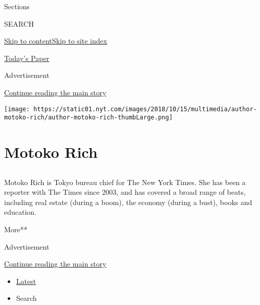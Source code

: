 Sections

SEARCH

\protect\hyperlink{site-content}{Skip to
content}\protect\hyperlink{site-index}{Skip to site index}

\href{https://myaccount.nytimes.com/auth/login?response_type=cookie\&client_id=vi}{}

\href{https://www.nytimes.com/section/todayspaper}{Today's Paper}

Advertisement

\protect\hyperlink{after-top}{Continue reading the main story}

\texttt{[image: https://static01.nyt.com/images/2018/10/15/multimedia/author-motoko-rich/author-motoko-rich-thumbLarge.png]}

\hypertarget{motoko-rich}{%
\section{Motoko Rich}\label{motoko-rich}}

\subsection{}

Motoko Rich is Tokyo bureau chief for The New York Times. She has been a
reporter with The Times since 2003, and has covered a broad range of
beats, including real estate (during a boom), the economy (during a
bust), books and education.

More**

Advertisement

\protect\hyperlink{after-mid1}{Continue reading the main story}

\begin{itemize}
\tightlist
\item
  \protect\hyperlink{stream-panel}{Latest}
\item
  Search
\end{itemize}

